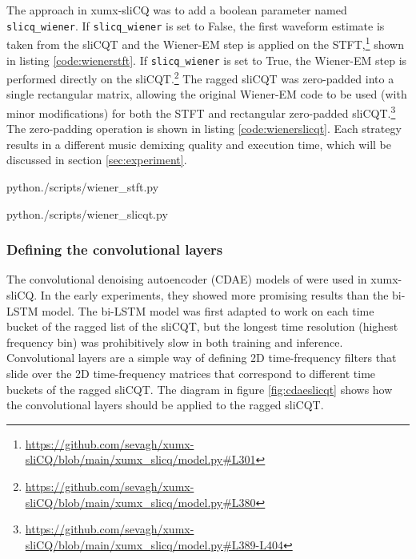 \documentclass[report.tex]{subfiles}
\begin{document}
The approach in xumx-sliCQ was to add a boolean parameter named \Verb#slicq_wiener#. If \Verb#slicq_wiener# is set to False, the first waveform estimate is taken from the sliCQT and the Wiener-EM step is applied on the STFT,\footnote{\url{https://github.com/sevagh/xumx-sliCQ/blob/main/xumx_slicq/model.py\#L301}} shown in listing \ref{code:wienerstft}. If \Verb#slicq_wiener# is set to True, the Wiener-EM step is performed directly on the sliCQT.\footnote{\url{https://github.com/sevagh/xumx-sliCQ/blob/main/xumx_slicq/model.py\#L380}} The ragged sliCQT was zero-padded into a single rectangular matrix, allowing the original Wiener-EM code to be used (with minor modifications) for both the STFT and rectangular zero-padded sliCQT.\footnote{\url{https://github.com/sevagh/xumx-sliCQ/blob/main/xumx_slicq/model.py\#L389-L404}} The zero-padding operation is shown in listing \ref{code:wienerslicqt}. Each strategy results in a different music demixing quality and execution time, which will be discussed in section \ref{sec:experiment}. 

\begin{listing}[ht]
  \centering
\begin{inputminted}[linenos,breaklines,frame=single,fontsize=\scriptsize]{python}{./scripts/wiener_stft.py}
\end{inputminted}
  \caption{Using the STFT in the Wiener-EM post-processing step}
  \label{code:wienerstft}
\end{listing}

\begin{listing}[ht]
  \centering
\begin{inputminted}[linenos,breaklines,frame=single,fontsize=\scriptsize]{python}{./scripts/wiener_slicqt.py}
\end{inputminted}
  \caption{Zero-padding the sliCQT for the Wiener-EM post-processing step}
  \label{code:wienerslicqt}
\end{listing}

\subsubsection{Defining the convolutional layers}
\label{sec:convlayers}

The convolutional denoising autoencoder (CDAE) models of \textcite{plumbley1, plumbley2} were used in xumx-sliCQ. In the early experiments, they showed more promising results than the bi-LSTM model. The bi-LSTM model was first adapted to work on each time bucket of the ragged list of the sliCQT, but the longest time resolution (highest frequency bin) was prohibitively slow in both training and inference. Convolutional layers are a simple way of defining 2D time-frequency filters that slide over the 2D time-frequency matrices that correspond to different time buckets of the ragged sliCQT. The diagram in figure \ref{fig:cdaeslicqt} shows how the convolutional layers should be applied to the ragged sliCQT.
\end{document}
